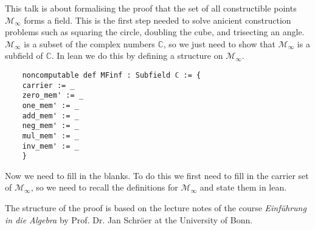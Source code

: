 This talk is about formalising the proof that the set of all constructible points $\mathcal{M}_{\infty}$ forms a field. 
This is the first step needed to solve anicient construction problems such as squaring the circle, doubling the cube, and trisecting an angle. 
$\mathcal{M}_{\infty}$ is a subset of the complex numbers $\mathbb{C}$, so we just need to show that $\mathcal{M}_{\infty}$ is a subfield of $\mathbb{C}$. 
In lean we do this by defining a structure on $\mathcal{M}_{\infty}$.

\begin{lstlisting}
    noncomputable def MFinf : Subfield ℂ := {
    carrier := _
    zero_mem' := _
    one_mem' := _
    add_mem' := _
    neg_mem' := _
    mul_mem' := _
    inv_mem' := _
    }
\end{lstlisting}

Now we need to fill in the blanks. To do this we first need to fill in the carrier set of $\mathcal{M}_{\infty}$, 
so we need to recall the definitions for $\mathcal{M}_{\infty}$ and state them in lean.

\begin{remark}
    The structure of the proof is based on the lecture notes of the course \emph{Einführung in die Algebra} by Prof. Dr. Jan Schröer at the University of Bonn.\cite{JAN_SCHROEER:2023}
\end{remark}
